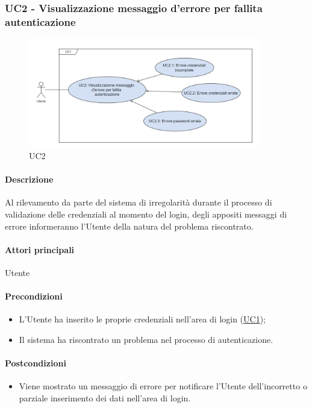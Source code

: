 \subsubsection{UC2 - Visualizzazione messaggio d'errore per fallita autenticazione}\label{UC2}

\begin{figure}[H]
  \centering
  \includegraphics[width=0.90\textwidth]{assets/uc2.png}
  \caption{UC2}
\end{figure}

\paragraph*{Descrizione}
Al rilevamento da parte del sistema di irregolarità durante il processo di validazione delle credenziali al momento del login, degli appositi messaggi di errore informeranno l’Utente della natura del problema riscontrato.

\paragraph*{Attori principali}
Utente

\paragraph*{Precondizioni}
\begin{itemize}
  \item L’Utente ha inserito le proprie credenziali nell’area di login (\hyperref[UC1]{UC1});
  \item Il sistema ha riscontrato un problema nel processo di autenticazione.  
\end{itemize}

\paragraph*{Postcondizioni}
\begin{itemize}
  \item Viene mostrato un messaggio di errore per notificare l’Utente dell’incorretto o parziale inserimento dei dati nell’area di login.
\end{itemize}

